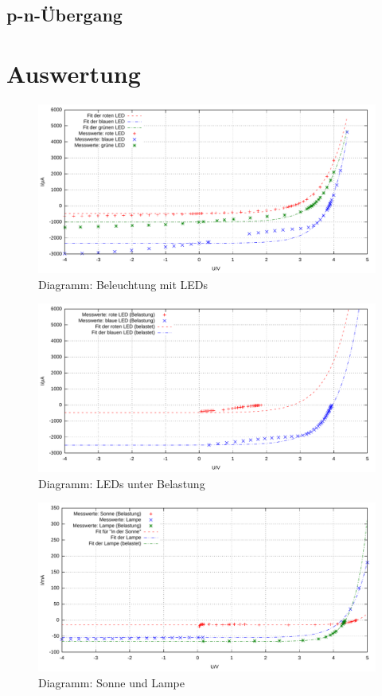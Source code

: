 \documentclass[numbers=noenddot,12pt,a4paper]{scrartcl}
\begin{document}
\subsection{p-n-Übergang}

\section{Auswertung}
\begin{figure}[H]
	\includegraphics[width=1\textwidth]{messwerte/stromspannungspannungsrichtigled.pdf}
	\caption{Diagramm: Beleuchtung mit LEDs} \label{img:ssrl}
\end{figure}
\begin{figure}[H]
	\includegraphics[width=1\textwidth]{messwerte/stromspannungspannungsrichtigbelastungled.pdf}
	\caption{Diagramm: LEDs unter Belastung} \label{img:ssrbl}
\end{figure}
\begin{figure}[H]
	\includegraphics[width=1\textwidth]{messwerte/stromspannunglampeundsonne.pdf}
	\caption{Diagramm: Sonne und Lampe} \label{img:sslus}
\end{figure}
\end{document}
